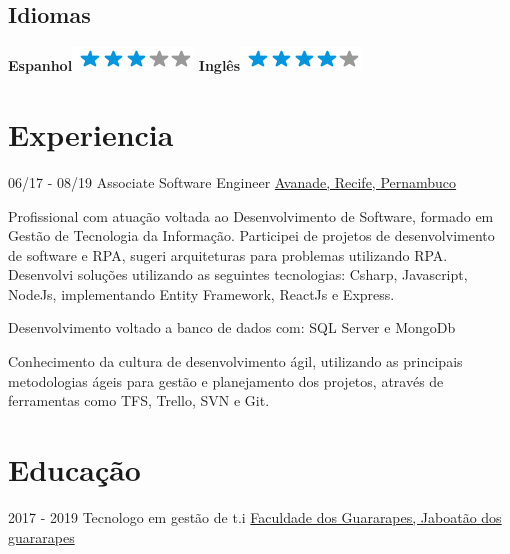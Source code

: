 \documentclass[]{friggeri-cv}
\begin{document}
\begin{aside}
  \section{Idiomas}
    \textbf{Espanhol}\includegraphics[scale=0.40]{img/3stars.png}
    \textbf{Inglês}\includegraphics[scale=0.40]{img/4stars.png}
\end{aside}

\section{Experiencia}
\begin{entrylist}
  \entry
    {06/17 - 08/19}
    {Associate Software Engineer}
    {\href{https://www.avanade.com/pt-br}{Avanade, Recife, Pernambuco}}
    {Profissional com atuação voltada ao Desenvolvimento de Software, formado em Gestão de Tecnologia da Informação. Participei de projetos de desenvolvimento de software e RPA, sugeri arquiteturas para problemas utilizando RPA.
Desenvolvi soluções utilizando as seguintes tecnologias: Csharp, Javascript, NodeJs, implementando Entity Framework, ReactJs e Express.

Desenvolvimento voltado a banco de dados com: SQL Server e MongoDb

Conhecimento da cultura de desenvolvimento ágil, utilizando as principais metodologias ágeis para gestão e planejamento dos projetos, através de ferramentas como TFS, Trello, SVN e Git.}
\end{entrylist}

\section{Educação}
\begin{entrylist}
  \entry
    {2017 - 2019}
    {Tecnologo em gestão de t.i}
    {\href{https://unifg.edu.br/}{Faculdade dos Guararapes, Jaboatão dos guararapes}}
    {}
\end{entrylist}
\end{document}
